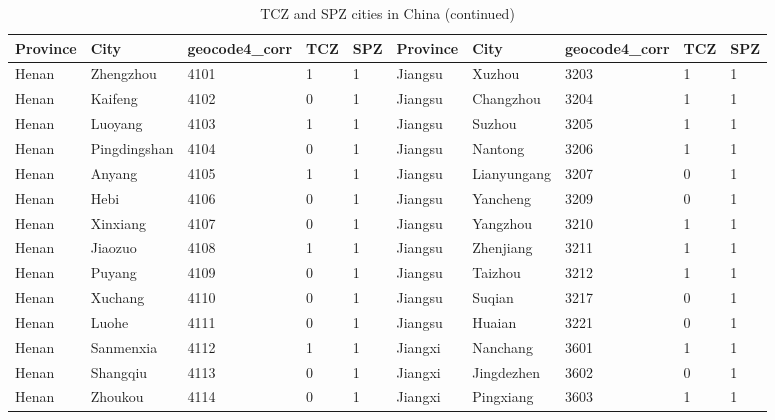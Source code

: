 \documentclass[12pt]{article}
\begin{document}
\begin{table}[!htbp] \centering
  \caption{TCZ and SPZ cities in China (continued)}
  \begin{adjustbox}{width=\textwidth, totalheight=\baselineskip,keepaspectratio}
    \label{tab:appendix2}
\begin{tabular}{llllllllll}
\hline
Province       & City         & geocode4\_corr & TCZ & SPZ & Province & City        & geocode4\_corr & TCZ & SPZ \\
\hline
Henan          & Zhengzhou    & 4101           & 1   & 1   & Jiangsu  & Xuzhou      & 3203           & 1   & 1   \\
Henan          & Kaifeng      & 4102           & 0   & 1   & Jiangsu  & Changzhou   & 3204           & 1   & 1   \\
Henan          & Luoyang      & 4103           & 1   & 1   & Jiangsu  & Suzhou      & 3205           & 1   & 1   \\
Henan          & Pingdingshan & 4104           & 0   & 1   & Jiangsu  & Nantong     & 3206           & 1   & 1   \\
Henan          & Anyang       & 4105           & 1   & 1   & Jiangsu  & Lianyungang & 3207           & 0   & 1   \\
Henan          & Hebi         & 4106           & 0   & 1   & Jiangsu  & Yancheng    & 3209           & 0   & 1   \\
Henan          & Xinxiang     & 4107           & 0   & 1   & Jiangsu  & Yangzhou    & 3210           & 1   & 1   \\
Henan          & Jiaozuo      & 4108           & 1   & 1   & Jiangsu  & Zhenjiang   & 3211           & 1   & 1   \\
Henan          & Puyang       & 4109           & 0   & 1   & Jiangsu  & Taizhou     & 3212           & 1   & 1   \\
Henan          & Xuchang      & 4110           & 0   & 1   & Jiangsu  & Suqian      & 3217           & 0   & 1   \\
Henan          & Luohe        & 4111           & 0   & 1   & Jiangsu  & Huaian      & 3221           & 0   & 1   \\
Henan          & Sanmenxia    & 4112           & 1   & 1   & Jiangxi  & Nanchang    & 3601           & 1   & 1   \\
Henan          & Shangqiu     & 4113           & 0   & 1   & Jiangxi  & Jingdezhen  & 3602           & 0   & 1   \\
Henan          & Zhoukou      & 4114           & 0   & 1   & Jiangxi  & Pingxiang   & 3603           & 1   & 1   \\

\end{tabular}
\end{adjustbox}
\end{table}
\end{document}
